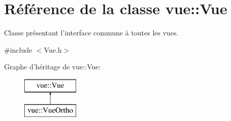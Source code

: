 \hypertarget{classvue_1_1_vue}{\section{Référence de la classe vue\-:\-:Vue}
\label{classvue_1_1_vue}
}


Classe présentant l'interface commune à toutes les vues.  




{\ttfamily \#include $<$Vue.\-h$>$}

Graphe d'héritage de vue\-:\-:Vue\-:\begin{figure}[H]
\begin{center}
\leavevmode
\includegraphics[height=2.000000cm]{classvue_1_1_vue}
\end{center}
\end{figure}

